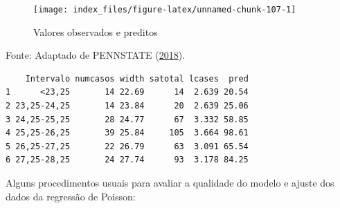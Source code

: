 \documentclass[12pt,brazil,oneside]{book}
\newenvironment{Shaded}{\begin{snugshade}}{\end{snugshade}}
\newcommand{\DataTypeTok}[1]{\textcolor[rgb]{0.13,0.29,0.53}{#1}}
\newcommand{\DecValTok}[1]{\textcolor[rgb]{0.00,0.00,0.81}{#1}}
\newcommand{\KeywordTok}[1]{\textcolor[rgb]{0.13,0.29,0.53}{\textbf{#1}}}
\newcommand{\NormalTok}[1]{#1}
\newcommand{\OperatorTok}[1]{\textcolor[rgb]{0.81,0.36,0.00}{\textbf{#1}}}
\newcommand{\StringTok}[1]{\textcolor[rgb]{0.31,0.60,0.02}{#1}}
\begin{document}
\begin{Shaded}
\end{Shaded}

\begin{figure}[H]

{\centering \texttt{[image: index\_files/figure-latex/unnamed-chunk-107-1]} 

}

\caption{Valores observados e preditos}\label{fig:unnamed-chunk-107}
\end{figure}

Fonte: Adaptado de PENNSTATE (\protect\hyperlink{ref-penn2018}{2018}).

\begin{Shaded}
\end{Shaded}

\begin{verbatim}
    Intervalo numcasos width satotal lcases  pred
1      <23,25       14 22.69      14  2.639 20.54
2 23,25-24,25       14 23.84      20  2.639 25.06
3 24,25-25,25       28 24.77      67  3.332 58.85
4 25,25-26,25       39 25.84     105  3.664 98.61
5 26,25-27,25       22 26.79      63  3.091 65.54
6 27,25-28,25       24 27.74      93  3.178 84.25
\end{verbatim}

Alguns procedimentos usuais para avaliar a qualidade do modelo e ajuste dos dados da regressão de Poisson:
\end{document}
